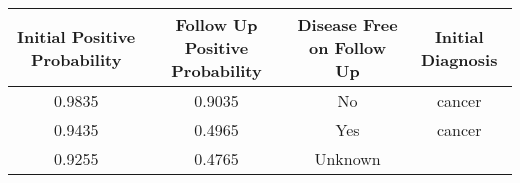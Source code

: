 \documentclass[12pt,]{article}
\begin{document}
\begin{longtable}[]{@{}cccc@{}}
\toprule
\begin{minipage}[b]{0.24\columnwidth}\centering\strut
Initial Positive Probability\strut
\end{minipage} & \begin{minipage}[b]{0.26\columnwidth}\centering\strut
Follow Up Positive Probability\strut
\end{minipage} & \begin{minipage}[b]{0.22\columnwidth}\centering\strut
Disease Free on Follow Up\strut
\end{minipage} & \begin{minipage}[b]{0.16\columnwidth}\centering\strut
Initial Diagnosis\strut
\end{minipage}\tabularnewline
\midrule
\endhead
\begin{minipage}[t]{0.24\columnwidth}\centering\strut
0.9835\strut
\end{minipage} & \begin{minipage}[t]{0.26\columnwidth}\centering\strut
0.9035\strut
\end{minipage} & \begin{minipage}[t]{0.22\columnwidth}\centering\strut
No\strut
\end{minipage} & \begin{minipage}[t]{0.16\columnwidth}\centering\strut
cancer\strut
\end{minipage}\tabularnewline
\begin{minipage}[t]{0.24\columnwidth}\centering\strut
0.9435\strut
\end{minipage} & \begin{minipage}[t]{0.26\columnwidth}\centering\strut
0.4965\strut
\end{minipage} & \begin{minipage}[t]{0.22\columnwidth}\centering\strut
Yes\strut
\end{minipage} & \begin{minipage}[t]{0.16\columnwidth}\centering\strut
cancer\strut
\end{minipage}\tabularnewline
\begin{minipage}[t]{0.24\columnwidth}\centering\strut
0.9255\strut
\end{minipage} & \begin{minipage}[t]{0.26\columnwidth}\centering\strut
0.4765\strut
\end{minipage} & \begin{minipage}[t]{0.22\columnwidth}\centering\strut
Unknown\strut

\end{minipage}
\end{longtable}
\end{document}
